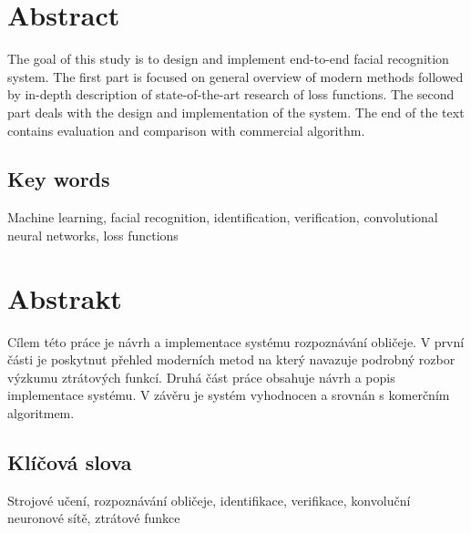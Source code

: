 \section*{Abstract}
The goal of this study is to design and implement end-to-end facial recognition system.
The first part is focused on general overview of modern methods followed by in-depth description of
state-of-the-art research of loss functions.
The second part deals with the design and implementation of the system.
The end of the text contains evaluation and comparison with commercial algorithm.

\vspace{1cm}

\subsection*{Key words}
Machine learning, facial recognition, identification, verification, convolutional neural networks, loss functions

\vfill

\section*{Abstrakt}
Cílem této práce je návrh a implementace systému rozpoznávání obličeje.
V první části je poskytnut přehled moderních metod na který navazuje podrobný rozbor výzkumu ztrátových funkcí.
Druhá část práce obsahuje návrh a popis implementace systému.
V závěru je systém vyhodnocen a srovnán s komerčním algoritmem.

\vspace{1cm}

\subsection*{Klíčová slova}
Strojové učení, rozpoznávání obličeje, identifikace, verifikace, konvoluční neuronové sítě, ztrátové funkce